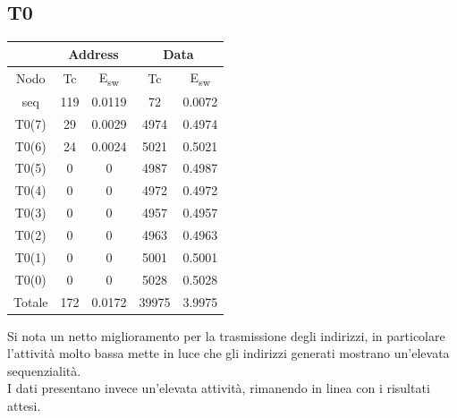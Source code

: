 \documentclass[11pt,  english, makeidx, a4paper, titlepage, oneside]{book}
\begin{document}
\subsection{T0}
\begin{center}
	\begin{tabular}{|c|c|c||c|c|}
	\hline
	& \multicolumn{2}{c}{Address} & \multicolumn{2}{c}{Data}\\
	\hline
	Nodo & Tc & E\textsubscript{sw} & Tc & E\textsubscript{sw} \\
	\hline
	seq & 119 & 0.0119 & 72 & 0.0072  \\
	\hline
	T0(7) & 29 & 0.0029 & 4974 & 0.4974\\
	 \hline
	T0(6) & 24 & 0.0024 & 5021 & 0.5021\\
	\hline
	T0(5) & 0 & 0 & 4987 & 0.4987\\
	\hline
	T0(4) & 0 & 0 & 4972 & 0.4972\\
	\hline
	T0(3) & 0 & 0 & 4957 & 0.4957\\
	\hline
	T0(2) & 0 & 0 & 4963 & 0.4963\\
	\hline
	T0(1) & 0 & 0 & 5001 & 0.5001\\
	\hline
	T0(0) & 0 & 0 & 5028 & 0.5028\\
	\hline
	Totale & 172 & 0.0172 & 39975 & 3.9975\\
	\hline
	\end{tabular}	
\end{center}
\vspace{0.3cm}
Si nota un netto miglioramento per la trasmissione degli indirizzi, in particolare l'attività molto bassa mette in luce che gli indirizzi generati mostrano un'elevata sequenzialità.
\\
I dati presentano invece un'elevata attività, rimanendo in linea con i risultati attesi.
\newpage
\end{document}
